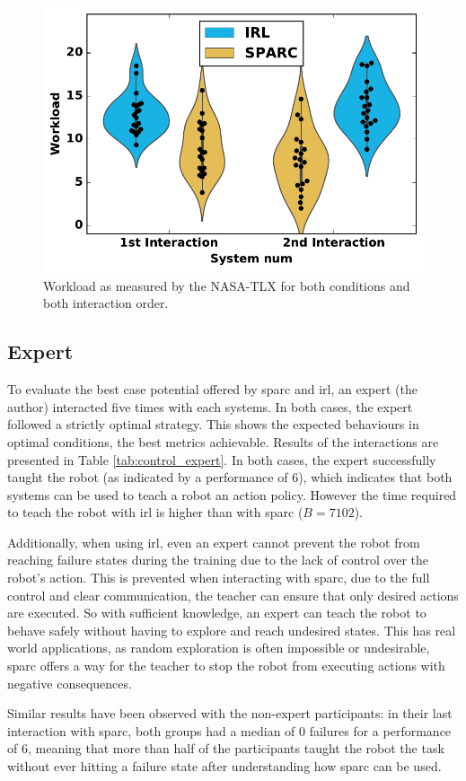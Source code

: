 \begin{figure}[ht]
	\includegraphics[width=.5\textwidth]{workload.pdf}
	\centering
	\caption{Workload as measured by the NASA-TLX for both conditions and both interaction order.
	}
	\label{fig:control_workload}
\end{figure}

\subsection{Expert} \label{ssec:control_expert}

To evaluate the best case potential offered by \gls{sparc} and \gls{irl}, an expert (the author) interacted five times with each systems. In both cases, the expert followed a strictly optimal strategy. This shows the expected behaviours in optimal conditions, the best metrics achievable. Results of the interactions are presented in Table \ref{tab:control_expert}. In both cases, the expert successfully taught the robot (as indicated by a performance of 6), which indicates that both systems can be used to teach a robot an action policy. However the time required to teach the robot with \gls{irl} is higher than with \gls{sparc} ($B=7102$). 

Additionally, when using \gls{irl}, even an expert cannot prevent the robot from reaching failure states during the training due to the lack of control over the robot's action. This is prevented when interacting with \gls{sparc}, due to the full control and clear communication, the teacher can ensure that only desired actions are executed. So with sufficient knowledge, an expert can teach the robot to behave safely without having to explore and reach undesired states. This has real world applications, as random exploration is often impossible or undesirable, \gls{sparc} offers a way for the teacher to stop the robot from executing actions with negative consequences.

Similar results have been observed with the non-expert participants: in their last interaction with \gls{sparc}, both groups had a median of 0 failures for a performance of 6, meaning that more than half of the participants taught the robot the task without ever hitting a failure state after understanding how \gls{sparc} can be used.

